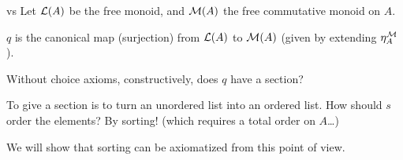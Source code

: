 \documentclass[9pt]{beamer}
\begin{document}
\begin{frame}{ vs }
Let $\mathcal{L}(A)$ be the \alert{free monoid}, and $\mathcal{M}(A)$ the \alert{free commutative monoid} on $A$.


$q$ is the \alert{canonical map} (surjection) from $\mathcal{L}(A)$ to $\mathcal{M}(A)$ (given by extending ${\eta_A^{\mathcal{M}}}$).

\begin{qblock}
    Without choice axioms, constructively, does $q$ have a section?
\end{qblock}

To give a section is to turn an \alert{unordered list} into an \alert{ordered list}.
How should $s$ order the elements? By sorting! (which requires a \alert{total order} on $A$\ldots)

We will show that sorting can be axiomatized from this point of view.




    
\end{frame}
\end{document}
